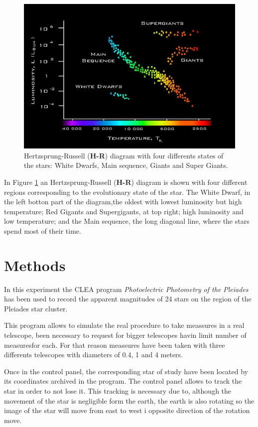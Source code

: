 \documentclass[twoside]{article}
\begin{document}
\begin{multicols}{2}
				\begin{figure}[H]
					\centering
					\includegraphics[scale=0.25]{Figures/hrcolour.jpg}
					\caption{\label{Img:HRTheo}Hertzsprung-Russell (\textbf{H-R}) diagram with four differents states of the stars: White Dwarfs, Main sequence, Giants and Super Giants. \cite{HRdiagram}}
				\end{figure}

			In Figure \ref{Img:HRTheo} an Hertzsprung-Russell (\textbf{H-R}) diagram is shown with four different regions corresponding to the evolutionary state of the star. The White Dwarf, in the left botton part of the diagram,the oldest with lowest luminosity but high temperature; Red Gigants and Supergigants, at top right; high luminosity and low temperature; and the Main sequence, the long diagonal line, where the stars spend most of their time.

		\section{Methods}

			In this experiment the CLEA program \textit{Photoelectric Photometry of the Pleiades} has been used to record the apparent magnitudes of 24 stars on the region of the Pleiades star cluster.

			This program allows to simulate the real procedure to take meassures in a real telescope, been necessary to request for bigger telescopes havin limit number of measuresfor each. For that reason meassures have been taken with three differents telescopes with diameters of 0.4, 1 and 4 meters.

			Once in the control panel, the corresponding star of study have been located by its coordinates archived in the program. The control panel allows to track the star in order to not lose it. This tracking is necessary due to, although the movement of the star is negligible form the earth, the earth is also rotating so the image of the star will move from east to west i opposite direction of the rotation move.


\end{multicols}
\end{document}
